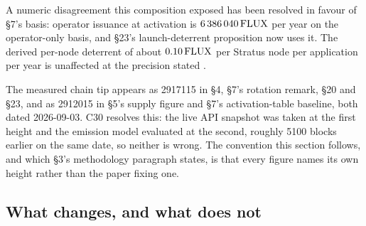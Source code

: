 A numeric disagreement this composition exposed has been resolved in favour of \S7's basis: operator issuance at \PNR{} activation is $\num{6386040}\,\mathrm{FLUX}$ per year on the operator-only basis, and \S23's launch-deterrent proposition now uses it. The derived per-node deterrent of about $\num{0.10}\,\mathrm{FLUX}$ per Stratus node per application per year is unaffected at the precision stated .

\begin{remark}
The measured chain tip appears as \num{2917115} in \S4, \S7's rotation remark, \S20 and \S23, and as
\num{2912015} in \S5's supply figure and \S7's activation-table baseline, both dated 2026-09-03.
C30 resolves this: the live API snapshot was taken at the first height and the emission model
evaluated at the second, roughly \num{5100} blocks earlier on the same date, so neither is wrong.
The convention this section follows, and which \S3's methodology paragraph states, is that every
figure names its own height rather than the paper fixing one.
\end{remark}

\subsection{What changes, and what does not}
\label{sec:e2e:diff}

